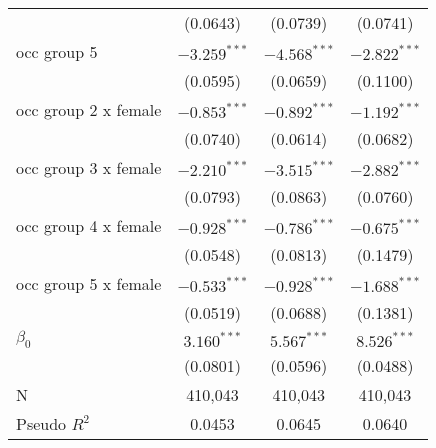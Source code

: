 \begin{tabular}{l|ccc|}
                           &           (0.0643) &           (0.0739) &           (0.0741) \\
occ group 5                &     $-3.259^{***}$ &     $-4.568^{***}$ &     $-2.822^{***}$ \\
                           &           (0.0595) &           (0.0659) &           (0.1100) \\
occ group 2 x female       &     $-0.853^{***}$ &     $-0.892^{***}$ &     $-1.192^{***}$ \\
                           &           (0.0740) &           (0.0614) &           (0.0682) \\
occ group 3 x female       &     $-2.210^{***}$ &     $-3.515^{***}$ &     $-2.882^{***}$ \\
                           &           (0.0793) &           (0.0863) &           (0.0760) \\
occ group 4 x female       &     $-0.928^{***}$ &     $-0.786^{***}$ &     $-0.675^{***}$ \\
                           &           (0.0548) &           (0.0813) &           (0.1479) \\
occ group 5 x female       &     $-0.533^{***}$ &     $-0.928^{***}$ &     $-1.688^{***}$ \\
                           &           (0.0519) &           (0.0688) &           (0.1381) \\
$\beta_0$                  &      $3.160^{***}$ &      $5.567^{***}$ &      $8.526^{***}$ \\
                           &           (0.0801) &           (0.0596) &           (0.0488) \\
N                          &            410,043 &            410,043 &            410,043 \\
Pseudo $R^2$               &             0.0453 &             0.0645 &             0.0640 \\
\bottomrule
\end{tabular}
